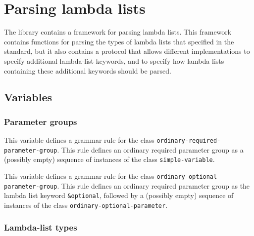 \chapter{Parsing lambda lists}
\label{chap-user-parsing-lambda-lists}

The \sysname{} library contains a framework for parsing lambda lists.
This framework contains functions for parsing the types of lambda
lists that specified in the \commonlisp{} standard, but it also
contains a protocol that allows different implementations to specify
additional lambda-list keywords, and to specify how lambda lists
containing these additional keywords should be parsed.

\section{Variables}

\subsection{Parameter groups}


This variable defines a grammar rule for the class
\texttt{ordinary-required-parameter-group}.  This rule defines an
ordinary required parameter group as a (possibly empty) sequence of
instances of the class \texttt{simple-variable}.


This variable defines a grammar rule for the class
\texttt{ordinary-optional-parameter-group}.  This rule defines an
ordinary required parameter group as the lambda list keyword
\texttt{\&optional}, followed by a (possibly empty) sequence of
instances of the class \texttt{ordinary-optional-parameter}.




\subsection{Lambda-list types}




